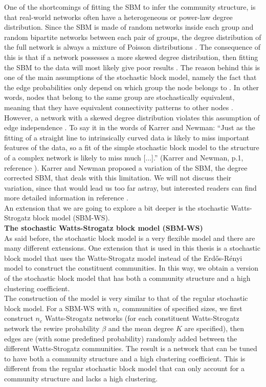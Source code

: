 \documentclass[11 pt , letterpaper , twoside , openright]{book}
\begin{document}
One of the shortcomings of fitting the SBM to infer the community structure, is that real-world networks often have a heterogeneous or power-law degree distribution. Since the SBM is made of random networks inside each group and random bipartite networks between each pair of groups, the degree distribution of the full network is always a mixture of Poisson distributions \cite{Clauset2017}. The consequence of this is that if a network possesses a more skewed degree distribution, then fitting the SBM to the data will most likely give poor results \cite{Karrer2011}. The reason behind this is one of the main assumptions of the stochastic block model, namely the fact that the edge probabilities only depend  on which group the node belongs to \cite{Clauset2017}. In other words, nodes that belong to the same group are stochastically  equivalent, meaning that they have equivalent connectivity patterns to other nodes \cite{Clauset2017}. However, a network with a skewed degree distribution violates this assumption of edge independence \cite{Clauset2017}. To say it in the words of Karrer and Newman: ``Just as the fitting of a straight line to intrinsically curved data is likely to miss important features of the data, so a fit of the simple stochastic block model to the structure of a complex network is likely to miss much [...].'' (Karrer and Newman, p.1, reference \cite{Karrer2011}). Karrer and Newman proposed a variation of the SBM, the degree corrected SBM, that deals with this limitation. We will not discuss their variation, since that would lead us too far astray, but interested readers can find more detailed information in reference \cite{Karrer2011}. \\
\newline
An extension that we are going to explore a bit deeper is the stochastic Watts-Strogatz block model (SBM-WS).\\
\newpage
\noindent
\textbf{The stochastic Watts-Strogatz block model (SBM-WS)}\\
\newline
As said before, the stochastic block model is a very flexible model and there are many different extensions. One extension that is used in this thesis is a stochastic block model that uses the Watts-Strogatz model instead of the Erd\H{o}s-R\'{e}nyi model to construct the constituent communities. In this way, we obtain a version of the stochastic block model that has both a community structure and a high clustering coefficient.\\
\newline
The construction of the model is very similar to that of the regular stochastic block model. For a SBM-WS with $n_c$ communities of specified sizes, we first construct $n_c$ Watts-Strogatz networks (for each constituent Watts-Strogatz network the rewire probability $\beta$ and the mean degree $K$ are specified), then edges are (with some predefined probability) randomly added between the different Watts-Strogatz communities. The result is a network that can be tuned to have both a community structure and a high clustering coefficient. This is different from the regular stochastic block model that can only account for a community structure and lacks a high clustering.
\end{document}
